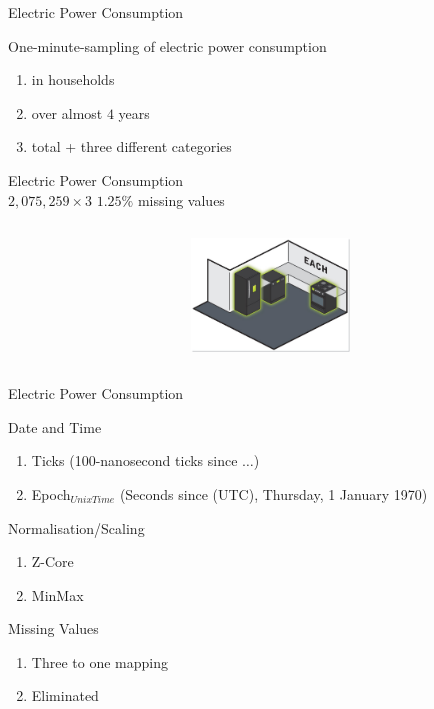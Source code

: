\begin{frame}{Electric Power Consumption}

\begin{tcolorbox}[colback=white!5,colframe=yellow!40!black,title=Charactrestics]
\bi
\mi One-minute-sampling of electric power consumption  
\begin{enumerate}
    \item in households
    \item over almost $4$ years
    \item total + three different categories 

  \end{enumerate}
\mi Electric Power Consumption\\
$2,075,259\times3$
\mi $1.25\%$ missing values
\ei
\begin{columns}[t] %
     \begin{column}[T]{7cm} %
     
     \end{column}
     \begin{column}[T]{5cm} %
          \includegraphics[height=3cm]{fig/each.jpg}
     \end{column}
     \end{columns}
\end{tcolorbox}




\end{frame}

\begin{frame}{Electric Power Consumption}
\begin{tcolorbox}[colback=green!5,colframe=green!40!black,title=Preprocessing]

\bi
\mi Date and Time
\begin{enumerate}
    \item Ticks {\tiny (100-nanosecond ticks since $\ldots$)}
    \item Epoch$_{Unix Time}$ {\tiny (Seconds since (UTC), Thursday, 1
    January 1970) }
  \end{enumerate}
\mi Normalisation/Scaling
\begin{enumerate}
    \item Z-Core 
    \item MinMax 
  \end{enumerate}
  
  \mi Missing Values
\begin{enumerate}
    \item Three to one mapping 
    \item Eliminated
  \end{enumerate}
\ei


\end{tcolorbox}
\end{frame}

